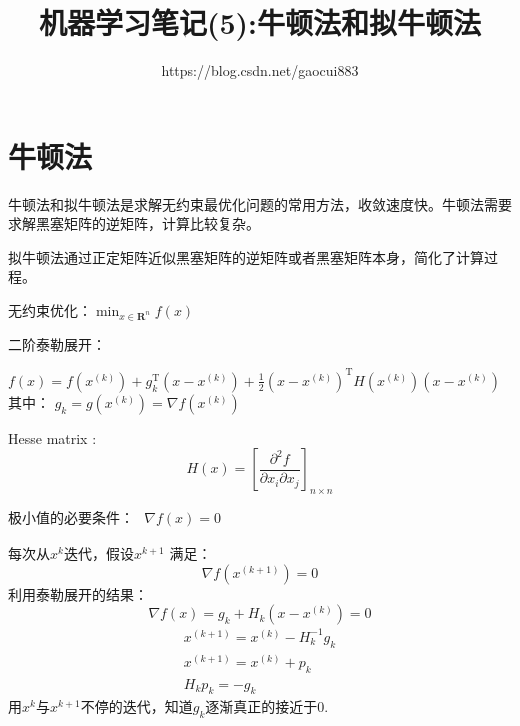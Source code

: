 \documentclass[UTF8]{ctexart}
\title{机器学习笔记(5):牛顿法和拟牛顿法}
\author{https://blog.csdn.net/gaocui883}
\begin{document}
 
\maketitle
 
\section{牛顿法}
牛顿法和拟牛顿法是求解无约束最优化问题的常用方法，收敛速度快。牛顿法需要求解黑塞矩阵的逆矩阵，计算比较复杂。

拟牛顿法通过正定矩阵近似黑塞矩阵的逆矩阵或者黑塞矩阵本身，简化了计算过程。




无约束优化：$\min _{x \in \mathbf{R}^{n}} f(x)$

二阶泰勒展开：

$f(x)=f\left(x^{(k)}\right)+g_{k}^{\mathrm{T}}\left(x-x^{(k)}\right)+\frac{1}{2}\left(x-x^{(k)}\right)^{\mathrm{T}} H\left(x^{(k)}\right)\left(x-x^{(k)}\right)$\\


其中： $g_{k}=g\left(x^{(k)}\right)=\nabla f\left(x^{(k)}\right)$

Hesse matrix : 
$$H(x)=\left[\frac{\partial^{2} f}{\partial x_{i} \partial x_{j}}\right]_{n \times n}$$

极小值的必要条件：
$
\begin{array}{c}
	\nabla f(x)=0
\end{array}
$

每次从$x^k$迭代，假设$x^{k+1}$ 满足：
$$
\nabla f\left(x^{(k+1)}\right)=0
$$
利用泰勒展开的结果：
$$
\nabla f(x)=g_{k}+H_{k}\left(x-x^{(k)}\right) = 0
$$
$$
\begin{array}{c}
x^{(k+1)}=x^{(k)}-H_{k}^{-1} g_{k} \\
x^{(k+1)}=x^{(k)}+p_{k} \\
H_{k} p_{k}=-g_{k}
\end{array}
$$
用$x^k$与$x^{k+1}$不停的迭代，知道$g_{k}$逐渐真正的接近于0.
\end{document}
